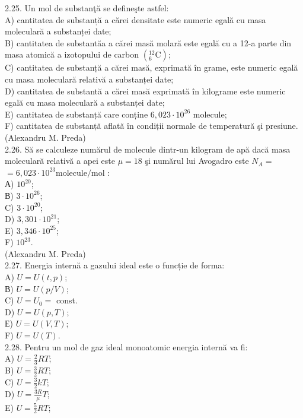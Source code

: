 2.25. Un mol de substanţă se defineşte astfel:\\
A) cantitatea de substanță a cărei densitate este numeric egală cu masa moleculară a substanței date;\\
B) cantitatea de substantăa a cărei masă molară este egală cu a 12-a parte din masa atomică a izotopului de carbon $\left({ }_{6}^{12} \mathrm{C}\right)$;\\
C) cantitatea de substanță a cărei masă, exprimată în grame, este numeric egală cu masa moleculară relativă a substanței date;\\
D) cantitatea de substantă a cărei masă exprimată în kilograme este numeric egală cu masa moleculară a substanței date;\\
E) cantitatea de substanță care conține $6,023 \cdot 10^{26}$ molecule;\\
F) cantitatea de substanță aflată în condiții normale de temperatură şi presiune.\\
(Alexandru M. Preda)\\
2.26. Să se calculeze numărul de molecule dintr-un kilogram de apă dacă masa moleculară relativă a apei este $\mu=18$ şi numărul lui Avogadro este $N_{A}=$ $=6,023 \cdot 10^{23} \mathrm{molecule} / \mathrm{mol}$ :\\
А) $10^{20}$;\\
В) $3 \cdot 10^{26}$;\\
C) $3 \cdot 10^{20}$;\\
D) $3,301 \cdot 10^{21}$;\\
E) $3,346 \cdot 10^{25}$;\\
F) $10^{23}$.\\
(Alexandru M. Preda)\\
2.27. Energia internă a gazului ideal este o funcție de forma:\\
A) $U=U(t, p)$;\\
В) $U=U(p / V)$;\\
C) $U=U_{0}=$ const.\\
D) $U=U(p, T)$;\\
Е) $U=U(V, T)$;\\
F) $U=U(T)$.\\
2.28. Pentru un mol de gaz ideal monoatomic energia internă va fi:\\
A) $U=\frac{2}{3} R T$;\\
B) $U=\frac{3}{2} R T$;\\
C) $U=\frac{3}{2} k T$;\\
D) $U=\frac{3 R}{\mu} T$;\\
E) $U=\frac{5}{2} R T$;\\

